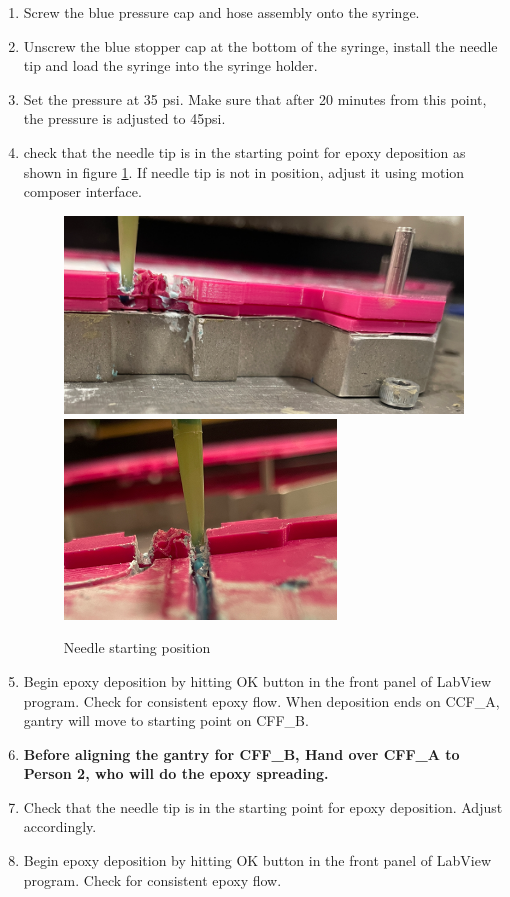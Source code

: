 \documentclass[12pt]{cornelltfpxsop}
\begin{document}
\begin{paracol}{2}
\begin{enumerate}
        \item Screw the blue pressure cap and hose assembly onto the syringe.
        \item Unscrew the blue stopper cap at the bottom of the syringe, install the needle tip and load the syringe into the syringe holder.
        \item Set the pressure at 35 psi. Make sure that after 20 minutes from this point, the pressure is adjusted to 45psi.
        \item check that the needle tip is in the starting point for epoxy deposition as shown in figure \ref{needleref}. If needle tip is not in position, adjust it using motion composer interface.
        \begin{figure}[h!]
            \centering
            \includegraphics[width=0.45\linewidth]{img/NeedleRef.png}
            \includegraphics[width=0.45\linewidth]{img/NeedleRef2.png}
            \caption{Needle starting position}
            \label{needleref}
        \end{figure}
        \item Begin epoxy deposition by hitting OK button in the front panel of LabView program. Check for consistent epoxy flow. When deposition ends on CCF\_A, gantry will move to starting point on CFF\_B.  
        \item \textbf{Before aligning the gantry for CFF\_B, Hand over CFF\_A to Person 2, who will do the epoxy spreading.}
        \item Check that the needle tip is in the starting point for epoxy deposition. Adjust accordingly. 
        \item Begin epoxy deposition by hitting OK button in the front panel of LabView program. Check for consistent epoxy flow.

\end{enumerate}
\end{paracol}
\end{document}
